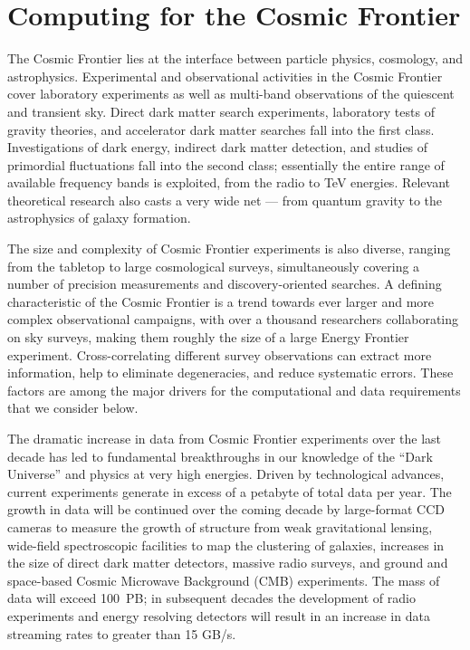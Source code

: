  
\section{Computing for the Cosmic Frontier}

The Cosmic Frontier lies at the interface between particle physics,
cosmology, and astrophysics. Experimental and observational activities
in the Cosmic Frontier cover laboratory experiments as well as
multi-band observations of the quiescent and transient sky. Direct
dark matter search experiments, laboratory tests of gravity theories,
and accelerator dark matter searches fall into the first
class. Investigations of dark energy, indirect dark matter detection,
and studies of primordial fluctuations fall into the second class;
essentially the entire range of available frequency bands is
exploited, from the radio to TeV energies. Relevant theoretical
research also casts a very wide net --- from quantum gravity to the
astrophysics of galaxy formation.

The size and complexity of Cosmic Frontier experiments is also
diverse, ranging from the tabletop to large cosmological surveys,
simultaneously covering a number of precision measurements and
discovery-oriented searches. A defining characteristic of the Cosmic
Frontier is a trend towards ever larger and more complex observational
campaigns, with over a thousand researchers collaborating on sky
surveys, making them roughly the size of a large Energy Frontier
experiment. Cross-correlating different survey observations can
extract more information, help to eliminate degeneracies, and reduce
systematic errors. These factors are among the major drivers for the
computational and data requirements that we consider below.

The dramatic increase in data from Cosmic Frontier experiments over
the last decade has led to fundamental breakthroughs in our knowledge
of the ``Dark Universe'' and physics at very high energies. Driven by
technological advances, current experiments generate in excess of a
petabyte  of total data per year. The growth in data will be
continued over the coming decade by large-format CCD cameras to
measure the growth of structure from weak gravitational lensing,
wide-field spectroscopic facilities to map the clustering of galaxies,
increases in the size of direct dark matter detectors, massive radio
surveys, and ground and space-based Cosmic Microwave Background (CMB)
experiments. The mass of data will exceed 100~PB; in subsequent decades
the development of radio experiments and energy resolving detectors
will result in an increase in data streaming rates to greater than 15 GB/s.


